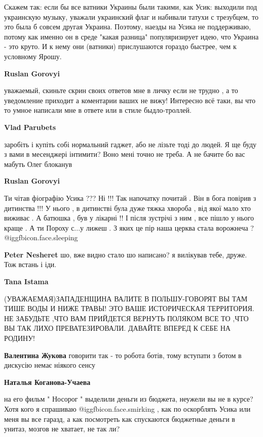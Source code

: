 \begin{itemize}
\begin{itemize}

Скажем так: если бы все ватники Украины были такими, как Усик: выходили под
украинскую музыку, уважали украинский флаг и набивали татухи с трезубцем, то
это была б совсем другая Украина. Поэтому, наезды на Усика не поддерживаю,
потому как именно он в среде "какая разница" популяризирует идею, что Украина -
это круто. И к нему они (ватники) прислушаются гораздо быстрее, чем к условному
Ярошу.

\textbf{Ruslan Gorovyi} 

уважаемый, скиньте скрин своих ответов мне в личку если не трудно , а то
уведомление приходит а коментарии ваших не вижу! Интересно всё таки, вы что то
умное написали мне в ответе или в стиле быдло-троллей.


\textbf{Vlad Parubets} 

заробіть і купіть собі нормальний гаджет, або не лізьте тоді до людей. Я ще
буду з вами в месенджері інтимити? Воно мені точно не треба. А не бачите бо вас
мабуть Олег блоканув

\textbf{Ruslan Gorovyi} 

Ти чітав фіографію Усика ??? Ні !!! Так напочатку почитай . Він в бога повірив
з дитинства !!! У нього , в дитинстві була дуже тяжка хвороба , від якої мало
хто виживає . А батюшка , був у лікарні !! І після зустрічі з ним , все пішло у
нього краще . А ти Пороху с...у лижеш . З яких це пір наша церква стала ворожнеча
?  @igg{fbicon.face.sleeping} 



\textbf{Peter Nesheret} шо, вже видно стало шо написано? я вилікував тебе, друже. Тож встань і іди.

\textbf{Tana Istama} 

(УВАЖАЕМАЯ)ЗАПАДЕНЩИНА ВАЛИТЕ В ПОЛЬШУ-ГОВОРЯТ ВЫ ТАМ ТИШЕ ВОДЫ И НИЖЕ
ТРАВЫ! ЭТО ВАШЕ ИСТОРИЧЕСКАЯ ТЕРРИТОРИЯ. НЕ ЗАБУДЬТЕ ,ЧТО ВАМ ПРИЙДЕТСЯ ВЕРНУТЬ
ПОЛЯКОМ ВСЕ ТО ,ЧТО ВЫ ТАК ЛИХО ПРЕВАТЕЗИРОВАЛИ. ДАВАЙТЕ ВПЕРЕД К СЕБЕ НА
РОДИНУ!

\textbf{Валентина Жукова} говорити так - то робота ботів, тому вступати з ботом в дискусію немає ніякого сенсу

\textbf{Наталья Коганова-Учаева}

на его фильм " Носорог " выделили деньги из бюджета, неужели вы не в курсе?
Хотя кого я спрашиваю @igg{fbicon.face.smirking} , как по оскорблять Усика или меня вы все гаразд, а как
посмотреть как спускаются бюджетные деньги в унитаз, мозгов не хватает, не так
ли?


\end{itemize}
\end{itemize}
